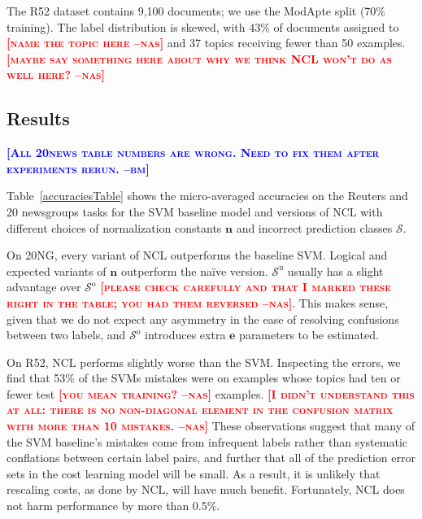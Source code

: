 \documentclass{article} %
\newcommand{\unorderedS}{\mathcal{S}^{\mathrm{u}}}
\newcommand{\orderedS}{\mathcal{S}^{\mathrm{o}}}
\newcommand{\ourmethod}{NCL}
\newcommand{\bmcomment}[1]{\textcolor{blue}{\textsc{\textbf{[#1 --bm]}}}}
\newcommand{\nascomment}[1]{\textcolor{red}{\textsc{\textbf{[#1 --nas]}}}}
\begin{document}
The R52 dataset contains 9,100 documents; we use the ModApte split
(70\% training).  The label distribution is skewed, with 43\% of
documents assigned to \nascomment{name the topic here} and 37 topics
receiving fewer than 50 examples.  \nascomment{maybe say something
  here about why we think \ourmethod{} won't do as well here?}


\subsection{Results}

\bmcomment{All 20news table numbers are wrong.  Need to fix them after experiments rerun.}

Table~\ref{accuraciesTable} shows the micro-averaged
accuracies on the Reuters and 20 newsgroups tasks for the 
SVM baseline model and versions of \ourmethod{} with
different choices of normalization constants 
$\mathbf{n}$ and incorrect prediction classes $\mathcal{S}$.  

On 20NG, every variant of \ourmethod{} outperforms the baseline SVM.  Logical and
expected variants of $\mathbf{n}$ outperform the na\"{i}ve version.
$\unorderedS$ usually has a slight advantage over $\orderedS$
\nascomment{please check carefully and that I marked these right in
  the table; you had them reversed}.  This makes sense, given that we
do not expect any asymmetry in the ease of resolving confusions
between two labels, and $\orderedS$ introduces extra $\mathbf{e}$ parameters to be
estimated.

On R52, \ourmethod{} performs slightly worse than the SVM.  Inspecting
the errors, we find that 53\% of the SVMs mistakes were on examples
whose topics had ten or fewer test \nascomment{you mean training?}
examples.  
\nascomment{I didn't understand this at all:  there is no non-diagonal element in the confusion matrix with more than 10 
mistakes.}
  These observations suggest that many of the SVM baseline's mistakes
come from infrequent labels rather than systematic conflations between certain
label pairs, and further that all of the prediction error sets in the
cost learning model will be small.  As a result, it is
unlikely that rescaling costs, as done by \ourmethod{}, will have much
benefit.  Fortunately, \ourmethod{} does not harm performance by more
than 0.5\%.
\end{document}
